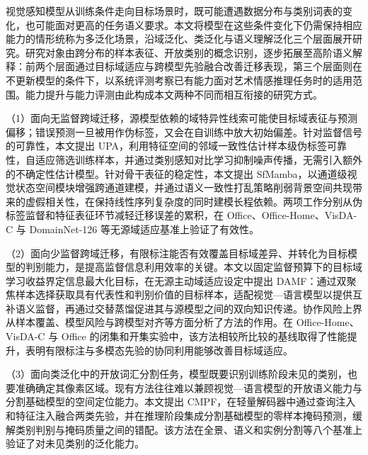 \begin{conclusions}

视觉感知模型从训练条件走向目标场景时，既可能遭遇数据分布与类别词表的变化，也可能面对更高的任务语义要求。本文将模型在这些条件变化下仍需保持相应能力的情形统称为多泛化场景，沿域泛化、类泛化与语义理解泛化三个层面展开研究。研究对象由跨分布的样本表征、开放类别的概念识别，逐步拓展至高阶语义解释：前两个层面通过目标域适应与跨模型先验融合改善迁移表现，第三个层面则在不更新模型的条件下，以系统评测考察已有能力面对艺术情感推理任务时的适用范围。能力提升与能力评测由此构成本文两种不同而相互衔接的研究方式。


（1）面向无监督跨域迁移，源模型依赖的域特异性线索可能使目标域表征与预测偏移；错误预测一旦被用作伪标签，又会在自训练中放大初始偏差。针对监督信号的可靠性，本文提出 UPA，利用特征空间的邻域一致性估计样本级伪标签可靠性，自适应筛选训练样本，并通过类别感知对比学习抑制噪声传播，无需引入额外的不确定性估计模型。针对骨干表征的稳定性，本文提出 SfMamba，以通道级视觉状态空间模块增强跨通道建模，并通过语义一致性打乱策略削弱背景空间共现带来的虚假相关性，在保持线性序列复杂度的同时建模长程依赖。两项工作分别从伪标签监督和特征表征环节减轻迁移误差的累积，在 Office、Office-Home、VisDA-C 与 DomainNet-126 等无源域适应基准上验证了有效性。

（2）面向少监督跨域迁移，有限标注能否有效覆盖目标域差异、并转化为目标模型的判别能力，是提高监督信息利用效率的关键。本文以固定监督预算下的目标域学习收益界定信息最大化目标，在无源主动域适应设定中提出 DAMF：通过双聚焦样本选择获取具有代表性和判别价值的目标样本，适配视觉—语言模型以提供互补语义监督，再通过交替蒸馏促进其与源模型之间的双向知识传递。协作风险上界从样本覆盖、模型风险与跨模型对齐等方面分析了方法的作用。在 Office-Home、VisDA-C 与 Office 的闭集和开集实验中，该方法相较所比较的基线取得了性能提升，表明有限标注与多模态先验的协同利用能够改善目标域适应。

（3）面向类泛化中的开放词汇分割任务，模型既要识别训练阶段未见的类别，也要准确确定其像素区域。现有方法往往难以兼顾视觉—语言模型的开放语义能力与分割基础模型的空间定位能力。本文提出 CMPF，在轻量解码器中通过查询注入和特征注入融合两类先验，并在推理阶段集成分割基础模型的零样本掩码预测，缓解类别判别与掩码质量之间的错配。该方法在全景、语义和实例分割等八个基准上验证了对未见类别的泛化能力。


\end{conclusions}
